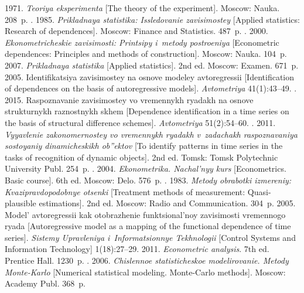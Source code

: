 \begin{multicols}{2}
{{\begin{thebibliography}{99}
 1971. \textit{Teoriya eksperimenta} [The theory of the 
experiment]. Moscow: Nauka. 
208~p.
. 1985. \textit{Prikladnaya 
statistika: Issledovanie zavisimostey} [Applied statistics: Research of dependences]. 
Moscow: Finance and Statistics. 487~p.
. 2000. \textit{Ekono\-met\-ri\-che\-skie 
zavisimosti: Printsipy i~metody postroeniya} [Econometric dependences: Principles 
and methods of construction]. Moscow: Nauka. 104~p.
 2007. \textit{Prikladnaya statistika} [Applied statistics].  2nd ed. 
Moscow: Examen. 671~p.
 2005. Identifikatsiya zavisimostey na osno\-ve modeley 
avtoregressii [Identification of dependences on the basis of autoregressive models]. 
\textit{Avtometriya} 41(1):43--49.
. 2015. Ras\-po\-zna\-va\-nie zavisimostey 
vo vremennykh ryadakh na osnove strukturnykh raznostnykh skhem [Dependence 
identification in a time series on the basis of structural difference schemes]. 
\textit{Avtometriya} 51(2):54--60.
. 2011. 
\textit{Vyyavlenie zakonomernostey vo vremennykh ryadakh v~zadachakh 
raspoznavaniya sostoyaniy dinamicheskikh ob''ektov} [To identify patterns in time 
series in the tasks of recognition of dynamic objects].  2nd ed. 
Tomsk: Tomsk Polytechnic University Publ. 254~p.
. 2004. 
\textit{Ekonometrika. Nachal'nyy kurs}  [Econometrics. Basic course].  6th ed. 
Moscow: Delo. 576~p.
. 1983. \textit{Metody obrabotki 
izmereniy: Kvazipravdopodobnye otsenki} [Treatment methods of measurement: 
Quasi-plausible estimations]. 2nd ed. Moscow: Radio and 
Communication. 304~p.
 2005. Model' avtoregressii kak otobrazhenie funktsional'noy 
zavisimosti vremennogo ryada [Autoregressive model as a mapping of the functional 
dependence of time series]. \textit{Sistemy Upravleniya i~Informatsionnye 
Tekhnologii} [Control Systems and Information Technology] 1(18):27--29.
 2011. \textit{Econometric analysis}. 7th ed. Prentice Hall. 
1230~p.
. 2006. \textit{Chislennoe 
statisticheskoe modelirovanie. Metody Monte-Karlo} [Numerical statistical modeling. 
Monte-Carlo methods]. Moscow: Academy Publ. 368~p.
\end{thebibliography}

 }
 }

\end{multicols}

